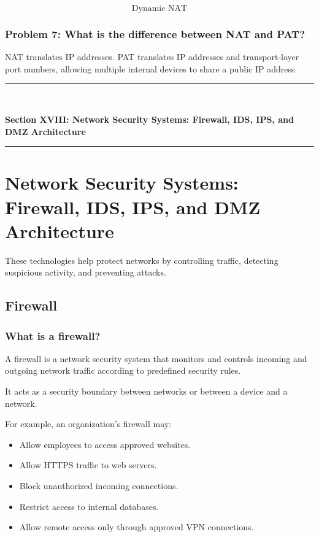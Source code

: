 \[
\boxed{\text{Dynamic NAT}}
\]

\subsubsection*{Problem 7: What is the difference between NAT and PAT?}
NAT translates IP addresses.
PAT translates IP addresses and transport-layer port numbers, allowing multiple internal devices to share a public IP address.

\newpage

\newpage
\begin{center}
\vspace{0.5em}
{\color{primary}\rule{0.45\textwidth}{1.2pt}\\[4pt]}
{\Large\bfseries\color{primary} Section XVIII: Network Security Systems: Firewall, IDS, IPS, and DMZ Architecture\\[2pt]}
{\color{primary}\rule{0.45\textwidth}{1.2pt}}
\vspace{0.5em}
\end{center}

\section{Network Security Systems: Firewall, IDS, IPS, and DMZ Architecture}



These technologies help protect networks by controlling traffic, detecting suspicious activity, and preventing attacks.

\subsection{Firewall}

\subsubsection{What is a firewall?}

A firewall is a network security system that monitors and controls incoming and outgoing network traffic according to predefined security rules.

It acts as a security boundary between networks or between a device and a network.

For example, an organization's firewall may:

\begin{itemize}
\item Allow employees to access approved websites.
\item Allow HTTPS traffic to web servers.
\item Block unauthorized incoming connections.
\item Restrict access to internal databases.
\item Allow remote access only through approved VPN connections.
\end{itemize}


